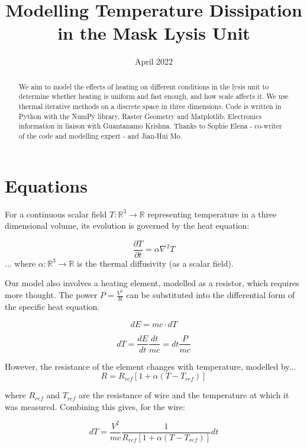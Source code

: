 \documentclass{article}
\title{Modelling Temperature Dissipation in the Mask Lysis Unit}
\date{April 2022}
\begin{document}
\maketitle

\begin{abstract}
    We aim to model the effects of heating on different conditions in the lysis unit to determine whether heating is uniform and fast enough, and how scale affects it. We use thermal iterative methods on a discrete space in three dimensions. Code is written in Python with the NumPy library, Raster Geometry and Matplotlib. Electronics information in liaison with Guantanamo Krishna. Thanks to Sophie Elena - co-writer of the code and modelling expert - and Jian-Hui Mo.
\end{abstract}

\section{Equations}
For a continuous scalar field $T:\mathbb{R}^3 \to \mathbb{R}$ representing temperature in a three dimensional volume,  its evolution is governed by the heat equation:

\begin{equation}
    \frac{\partial T}{\partial t}=\alpha \nabla^2 T
\end{equation}
... where $\alpha:\mathbb{R}^3 \to \mathbb{R}$ is the thermal diffusivity (as a scalar field).

Our model also involves a heating element, modelled as a resistor, which requires more thought. The power $P=\frac{V^2}{R}$ can be substituted into the differential form of the specific heat equation.

\begin{equation}
    dE = mc\cdot dT
\end{equation}

\begin{equation}
    dT = \frac{dE}{dt}\frac{dt}{mc}= dt \frac{P}{mc}
\end{equation}

However, the resistance of the element changes with temperature, modelled by...
\begin{equation}
    R = R_{ref}[1+\alpha(T-T_{ref})]
\end{equation}

where $R_{ref}$ and $T_{ref}$ are the resistance of wire and the temperature at which it was measured. Combining this gives, for the wire:

\begin{equation}
    dT = \frac{V^2}{mc}\frac{1}{R_{ref}[1+\alpha(T-T_{ref})]}dt
\end{equation}
\end{document}
